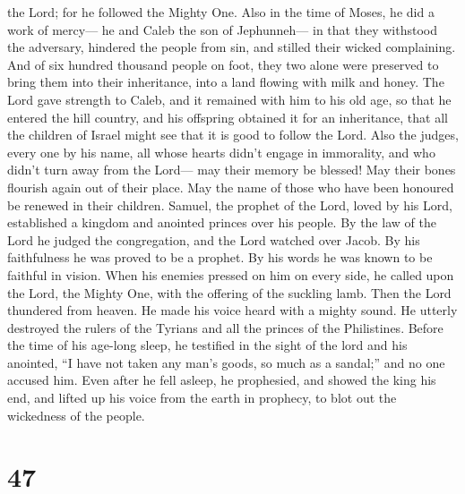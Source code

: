 the Lord; for he followed the Mighty One.  Also in the time
of Moses, he did a work of mercy--- he and Caleb the son of Jephunneh---
in that they withstood the adversary, hindered the people from sin, and
stilled their wicked complaining.  And of six hundred
thousand people on foot, they two alone were preserved to bring them
into their inheritance, into a land flowing with milk and honey.
 The Lord gave strength to Caleb, and it remained with him
to his old age, so that he entered the hill country, and his offspring
obtained it for an inheritance,  that all the children of
Israel might see that it is good to follow the Lord.  Also
the judges, every one by his name, all whose hearts didn't engage in
immorality, and who didn't turn away from the Lord--- may their memory
be blessed!  May their bones flourish again out of their
place. May the name of those who have been honoured be renewed in their
children.  Samuel, the prophet of the Lord, loved by his
Lord, established a kingdom and anointed princes over his people.
 By the law of the Lord he judged the congregation, and the
Lord watched over Jacob.  By his faithfulness he was proved
to be a prophet. By his words he was known to be faithful in vision.
 When his enemies pressed on him on every side, he called
upon the Lord, the Mighty One, with the offering of the suckling lamb.
 Then the Lord thundered from heaven. He made his voice
heard with a mighty sound.  He utterly destroyed the rulers
of the Tyrians and all the princes of the Philistines. 
Before the time of his age-long sleep, he testified in the sight of the
lord and his anointed, ``I have not taken any man's goods, so much as a
sandal;'' and no one accused him.  Even after he fell
asleep, he prophesied, and showed the king his end, and lifted up his
voice from the earth in prophecy, to blot out the wickedness of the
people.

\hypertarget{section-33}{%
\section{47}\label{section-33}}

